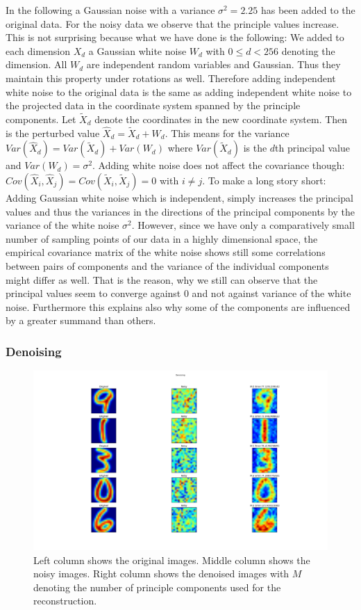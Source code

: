 \documentclass[a4paper, 12pt, titlepage]{article}
\begin{document}
In the following a Gaussian noise with a variance $\sigma^2=2.25$ has been added to the original data.
For the noisy data we observe that the principle values increase.
This is not surprising because what we have done is the following:
We added to each dimension $X_d$ a Gaussian white noise $W_d$ with $0\le d < 256$ denoting the dimension.
All $W_d$ are independent random variables and Gaussian.
Thus they maintain this property under rotations as well.
Therefore adding independent white noise to the original data is the same as adding independent white noise to the projected data in the coordinate system spanned by the principle components.
Let $\tilde{X}_d$ denote the coordinates in the new coordinate system.
Then is the perturbed value $\hat{X}_d = \tilde{X}_d + W_d$.
This means for the variance $Var(\hat{X}_d) = Var(\tilde{X}_d) + Var(W_d)$ where $Var(\tilde{X}_d)$ is the $d$th principal value and $Var(W_d)=\sigma^2$.
Adding white noise does not affect the covariance though: $Cov(\hat{X}_i,\hat{X}_j) = Cov(\tilde{X}_i,\tilde{X}_j) = 0$ with $i\not = j$.
To make a long story short: Adding Gaussian white noise which is independent, simply increases the principal values and thus the variances in the directions of the principal components by the variance of the white noise $\sigma^2$.
However, since we have only a comparatively small number of sampling points of our data in a highly dimensional space, the empirical covariance matrix of the white noise shows still some correlations between pairs of components and the variance of the individual components might differ as well.
That is the reason, why we still can observe that the principal values seem to converge against $0$ and not against variance of the white noise.
Furthermore this explains also why some of the components are influenced by a greater summand than others.

\subsubsection*{Denoising}

\begin{figure}[H]
	\includegraphics[width=20cm]{images/denoising.png}
	\caption{Left column shows the original images. Middle column shows the noisy images. Right column shows the denoised images with $M$ denoting the number of principle components used for the reconstruction.}
\end{figure}
\end{document}
